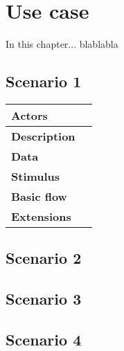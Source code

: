 \chapter{Use case}

In this chapter... blablabla

\clearpage

\section{Scenario 1}
\begin{table}[H]
	\begin{tabular}{ | l | l |}
		\hline
		{\bf Actors} & \\ \hline
		{\bf Description} & \\ \hline
		{\bf Data} & \\ \hline
		{\bf Stimulus} & \\ \hline
		{\bf Basic flow} & \\ \hline
		{\bf Extensions} & \\ \hline

	\end{tabular}
\end{table}

\section{Scenario 2}

\section{Scenario 3}

\section{Scenario 4}